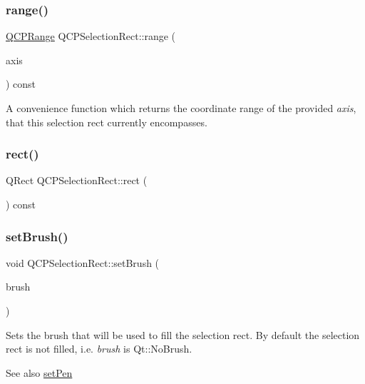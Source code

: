 \subsubsection{\texorpdfstring{range()}{range()}}
{\footnotesize\ttfamily \mbox{\hyperlink{class_q_c_p_range}{Q\+C\+P\+Range}} Q\+C\+P\+Selection\+Rect\+::range (\begin{DoxyParamCaption}\item[{const \mbox{\hyperlink{class_q_c_p_axis}{Q\+C\+P\+Axis}} $\ast$}]{axis }\end{DoxyParamCaption}) const}

A convenience function which returns the coordinate range of the provided {\itshape axis}, that this selection rect currently encompasses. \mbox{\label{class_q_c_p_selection_rect_a3812115ae4dfe2855bf1e58331c14805}} 
\subsubsection{\texorpdfstring{rect()}{rect()}}
{\footnotesize\ttfamily Q\+Rect Q\+C\+P\+Selection\+Rect\+::rect (\begin{DoxyParamCaption}{ }\end{DoxyParamCaption}) const\hspace{0.3cm}{\ttfamily [inline]}}

\mbox{\label{class_q_c_p_selection_rect_ab0c66f1484418782efa01f4153611080}} 
\subsubsection{\texorpdfstring{setBrush()}{setBrush()}}
{\footnotesize\ttfamily void Q\+C\+P\+Selection\+Rect\+::set\+Brush (\begin{DoxyParamCaption}\item[{const Q\+Brush \&}]{brush }\end{DoxyParamCaption})}

Sets the brush that will be used to fill the selection rect. By default the selection rect is not filled, i.\+e. {\itshape brush} is {\ttfamily Qt\+::\+No\+Brush}.

\begin{DoxySeeAlso}{See also}
\mbox{\hyperlink{class_q_c_p_selection_rect_ada20b7fb1b2dcbe50523262636b06963}{set\+Pen}} 
\end{DoxySeeAlso}
\mbox{\label{class_q_c_p_selection_rect_ada20b7fb1b2dcbe50523262636b06963}} 
